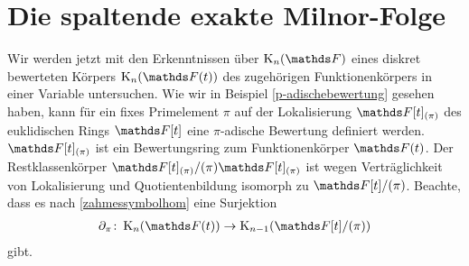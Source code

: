 \documentclass[ngerman,fontsize=11pt, paper=a4, parskip=half, titlepage=true, toc=bib]{scrartcl}
\begin{document}



\section{Die spaltende exakte Milnor-Folge}

Wir werden jetzt mit den Erkenntnissen über $\KnF$ eines diskret bewerteten
Körpers $\KnFt$ des zugehörigen Funktionenkörpers in einer Variable
untersuchen. Wie wir in Beispiel \ref{p-adischebewertung} gesehen
haben, kann für ein fixes Primelement $\pi$ auf der Lokalisierung 
$\F[t]_{(\pi)}$ des euklidischen Rings $\F[t]$ eine $\pi$-adische
Bewertung  definiert werden. $\F[t]_{(\pi)}$ ist ein
Bewertungsring zum Funktionenkörper $\Ft $.
Der Restklassenkörper $\F[t]_{(\pi)}/(\pi)\F[t]_{(\pi)}$ ist wegen
Verträglichkeit von Lokalisierung und Quotientenbildung isomorph zu
$\F[t]/(\pi)$.
Beachte, dass es nach \ref{zahmessymbolhom} eine Surjektion
\begin{gather*}
  \partial_\pi\colon \KnFt\to \K_{n-1}(\F[t]/(\pi))
\end{gather*}
gibt.
\end{document}
